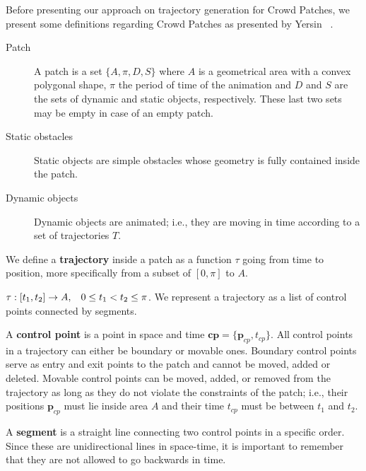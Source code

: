 Before presenting our approach on trajectory generation for Crowd Patches, we present some definitions regarding Crowd Patches as presented by Yersin \etal~\cite{Yersin:2009}.
 
 
\begin{description}

\item[Patch]{
A patch is a set $\{ A, \pi, D, S\}$ where $A$ is a geometrical area with a convex polygonal shape, $\pi$ the period of time of the animation and $D$ and $S$ are the sets of dynamic and static objects, respectively.
These last two sets may be empty in case of an empty patch.
}

\item[Static obstacles]{
Static objects are simple obstacles whose geometry is fully contained inside the patch.
}

\item[Dynamic objects]{
Dynamic objects are animated; i.e., they are moving in time according to a set of trajectories $T$.
}

\end{description}

We define a {\bf trajectory} inside a patch as a function $\tau$ going from time to position, more specifically from a subset of $[ 0,\pi ]$ to $A$.

$ \tau:[t_1,t_2]\rightarrow A, \hspace{0.3cm} 0 \leq t_1 < t_2 \leq \pi$.
We represent a trajectory as a list of control points connected by segments. 

A {\bf control point} is a point in space and time $\mathbf{cp} = \{\mathbf{p}_{cp}, t_{cp}\}$. All control points in a trajectory can either be boundary or movable ones. Boundary control points serve as entry and exit points to the patch and cannot be moved, added or deleted. Movable control points can be moved, added, or removed from the trajectory as long as they do not violate the constraints of the patch; i.e., their positions $\mathbf{p}_{cp}$ must lie inside area $A$ and their time $t_{cp}$ must be between $t_1$ and $t_2$.

A {\bf segment} is a straight line connecting two control points in a specific order. Since these are unidirectional lines in space-time, it is important to remember that they are not allowed to go backwards in time.

